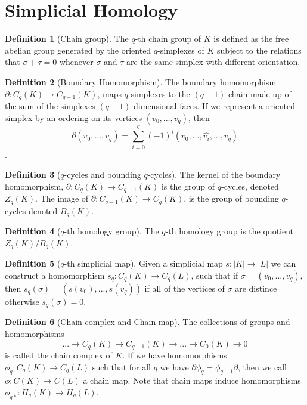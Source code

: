 \documentclass{article}
\theoremstyle{definition}
\newtheorem{definition}{Definition}[section]
\theoremstyle{remark}
\theoremstyle{remark}
\begin{document}
\section{Simplicial Homology}

\begin{definition}[Chain group]
    The $q$-th chain group of $K$ is defined as the free abelian group generated by the oriented $q$-simplexes of $K$ subject to the relations that $\sigma + \tau = 0$ whenever $\sigma$ and $\tau$ are the same simplex with different orientation.
\end{definition}

\begin{definition}[Boundary Homomorphism]
    The boundary homomorphism $\partial: C_q(K) \to C_{q-1}(K)$, maps $q$-simplexes to the $(q-1)$-chain made up of the sum of the simplexes $(q-1)$-dimensional faces.
    If we represent a oriented simplex by an ordering on its vertices $(v_0, ..., v_q)$, then 
    $$\partial (v_0, ..., v_q) = \sum_{i=0}^q (-1)^i (v_0, ..., \hat{v_i}, ..., v_q)$$.
\end{definition}

\begin{definition}[$q$-cycles and bounding $q$-cycles]
    The kernel of the boundary homomorphism, $\partial: C_q(K) \to C_{q-1}(K)$ is the group of $q$-cycles, denoted $Z_q(K)$.
    The image of $\partial: C_{q+1}(K) \to C_q(K)$, is the group of bounding $q$-cycles denoted $B_q(K)$.
\end{definition}

\begin{definition}[$q$-th homology group]
    The $q$-th homology group is the quotient $Z_q(K) / B_q(K)$.
\end{definition}

\begin{definition}[$q$-th simplicial map]
    Given a simplicial map $s: |K| \to |L|$ we can construct a homomorphism $s_q: C_q(K) \to C_q(L)$, such that if $\sigma = (v_0, ..., v_q)$, then $s_q(\sigma) = (s(v_0), ..., s(v_q))$ if all of the vertices of $\sigma$ are distince otherwise $s_q(\sigma) = 0$.
\end{definition}

\begin{definition}[Chain complex and Chain map]
    The collections of groups and homomorphisms $$ ... \to C_q(K) \to C_{q-1}(K)\to ... \to C_0(K) \to 0$$ is called the chain complex of $K$. If we have homomorphisms $\phi_q: C_q(K) \to C_q(L)$ such that for all $q$ we have $\partial \phi_q = \phi_{q-1}\partial$, then we call $\phi: C(K) \to C(L)$ a chain map. 
    Note that chain maps induce homomorphisms $\phi_{q*}: H_q(K) \to H_q(L)$. 
\end{definition}
\end{document}
